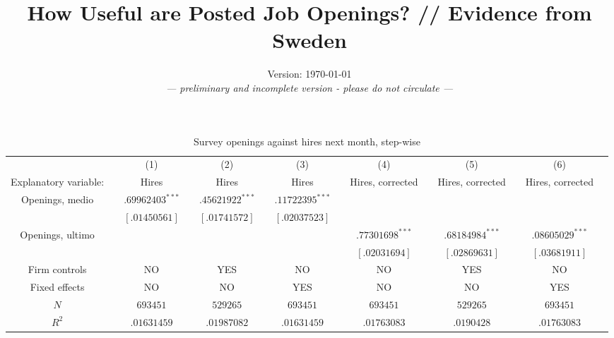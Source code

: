 \documentclass[11pt,article]{memoir}
\title{How Useful are Posted Job Openings? // Evidence from Sweden}
\date{Version: \today{}\\\emph{--- preliminary and incomplete version - please do not circulate ---}}
\begin{document}
\begin{landscape}
\begin{table}[htbp]{\pagewidth}
\caption{Survey openings against hires next month, step-wise}
\begin{tabularx}{\linewidth}{cXcXcXcXcXcXcX}
\hline
&& (1)							
&& (2)					
&& (3)
&& (4)
&& (5)
&& (6) \\
Explanatory variable: 
&& Hires
&& Hires 			
&& Hires
&& Hires, corrected 
&& Hires, corrected 
&& Hires, corrected \\ 
\hline 
Openings, medio    
& & $.69962403^{***}$          								
& & $.45621922^{***}$		   				
& & $.11722395^{***}$		         							
& &\\[0 mm]
&&\scriptsize{$[.01450561]$}       
&&\scriptsize{$[.01741572]$}
&&\scriptsize{$[.02037523]$}
&&\scriptsize{$$}
&&\scriptsize{$$}
&&\scriptsize{$$}
\\
Openings, ultimo    
& & 
& & 		   				
& & 		        
& &$.77301698^{***}$									
& &$.68184984^{***}$	
&& $.08605029^{***}$										
\\[0 mm]
&&\scriptsize{$$}
&&\scriptsize{$$}
&&\scriptsize{$$}
&&\scriptsize{$[.02031694]$}
&&\scriptsize{$[.02869631]$}
&&\scriptsize{$[.03681911]$}
\\	
Firm controls
& & NO 									
& & YES		   				
& & NO		        
& &	NO								
& &	YES								
& & NO
\\	
Fixed effects
& & NO									
& & NO		   				
& & YES		        
& &	NO								
& &	NO								
& & YES
\\	
$N $
& & $693451$									
& & $529265$		   				
& & $693451$				        
& &	$693451$								
& &	$529265$									
& & $693451$
\\	
$R^2$
& & $.01631459$
& & $.01987082$		   				
& & $.01631459$		        
& &	$.01763083$								
& &	$.0190428$								
& &$.01763083$
\\		
\hline 
\end{tabularx}
\end{table}
\end{landscape}
\end{document}
